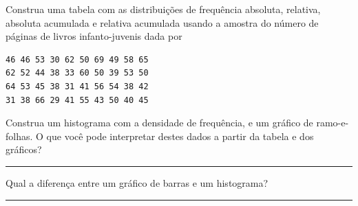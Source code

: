 \documentclass[a4paper,11pt,fleqn]{article}\usepackage[]{graphicx}\usepackage[]{color}
\theoremstyle{definition}
\begin{document}
\begin{compactenum}[7.]
\item Construa uma tabela com as distribuições de frequência absoluta,
  relativa, absoluta acumulada e relativa acumulada usando a amostra do
  número de páginas de livros infanto-juvenis dada por
\begin{verbatim}
46 46 53 30 62 50 69 49 58 65
62 52 44 38 33 60 50 39 53 50
64 53 45 38 31 41 56 54 38 42
31 38 66 29 41 55 43 50 40 45
\end{verbatim}
  Construa um histograma com a densidade de frequência, e um gráfico de
  ramo-e-folhas. O que você pode interpretar destes dados a partir da
  tabela e dos gráficos?
\end{compactenum}

\vspace{0.3cm}
\hrule
\vspace{0.3cm}

\begin{compactenum}[8.]
\item Qual a diferença entre um gráfico de barras e um histograma?
\end{compactenum}

\vspace{0.3cm}
\hrule
\vspace{0.3cm}
\end{document}
